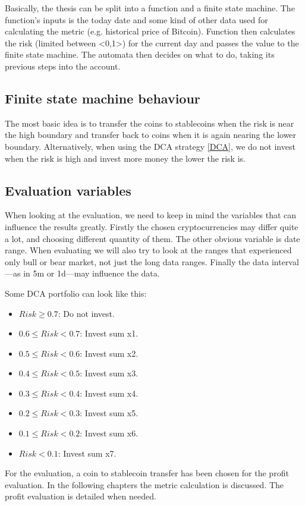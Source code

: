 Basically, the thesis can be split into a function and a finite state machine. The function's inputs is the today date and some kind of other data used for calculating the metric (e.g. historical price of Bitcoin). Function then calculates the risk (limited between <0,1>) for the current day and passes the value to the finite state machine. The automata then decides on what to do, taking its previous steps into the account.

\subsection*{Finite state machine behaviour}
The most basic idea is to transfer the coins to stablecoins when the risk is near the high boundary and transfer back to coins when it is again nearing the lower boundary. Alternatively, when using the DCA strategy \ref{DCA}, we do not invest when the risk is high and invest more money the lower the risk is.

\subsection*{Evaluation variables}
When looking at the evaluation, we need to keep in mind the variables that can influence the results greatly. Firstly the chosen cryptocurrencies may differ quite a lot, and choosing different quantity of them. The other obvious variable is date range. When evaluating we will also try to look at the ranges that experienced only bull or bear market, not just the long data ranges. Finally the data interval---as in 5m or 1d---may influence the data.

Some DCA portfolio can look like this:
\begin{itemize}
    \item $Risk \ge  0.7$: Do not invest.
    \item $0.6 \le Risk < 0.7$: Invest sum x1.
    \item $0.5 \le Risk < 0.6$: Invest sum x2.
    \item $0.4 \le Risk < 0.5$: Invest sum x3.
    \item $0.3 \le Risk < 0.4$: Invest sum x4.
    \item $0.2 \le Risk < 0.3$: Invest sum x5.
    \item $0.1 \le Risk < 0.2$: Invest sum x6.
    \item $Risk < 0.1$: Invest sum x7.
\end{itemize}

For the evaluation, a coin to stablecoin transfer has been chosen for the profit evaluation. In the following chapters the metric calculation is discussed. The profit evaluation is detailed when needed.

